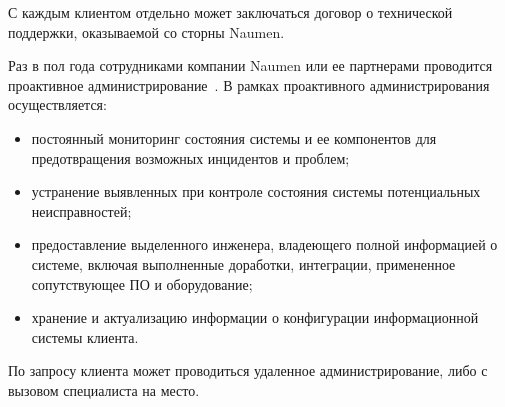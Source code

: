 С каждым клиентом отдельно может заключаться договор о технической поддержки, оказываемой со сторны Naumen.

Раз в пол года сотрудниками компании Naumen или ее партнерами проводится проактивное администрирование~\cite{naumen:support}.
В рамках проактивного администрирования осуществляется:
\begin{itemize}
    \item постоянный мониторинг состояния системы и ее компонентов для предотвращения возможных
    инцидентов и проблем;
    \item устранение выявленных при контроле состояния системы потенциальных неисправностей;
    \item предоставление выделенного инженера, владеющего полной информацией о системе, включая
    выполненные доработки, интеграции, примененное сопутствующее ПО и оборудование;
    \item хранение и актуализацию информации о конфигурации информационной системы клиента.
\end{itemize}

По запросу клиента может проводиться удаленное администрирование, либо с вызовом специалиста на место.